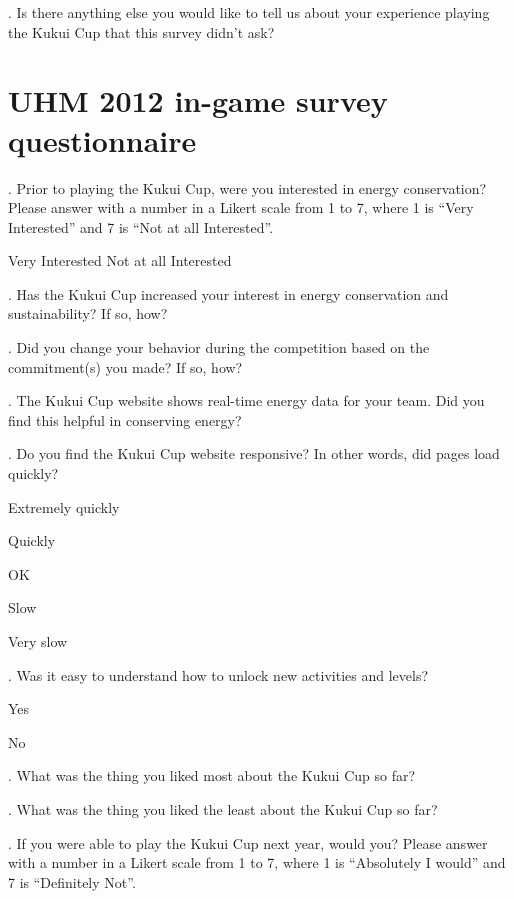 . Is there anything else you would like to tell us about your experience playing the Kukui Cup that this survey didn't ask?

\section {UHM 2012 in-game survey questionnaire}

. Prior to playing the Kukui Cup, were you interested in energy conservation? Please answer with a number in a Likert scale from 1 to 7, where 1 is ``Very Interested'' and 7 is ``Not at all Interested''.

\indent \indent Very Interested                \indent Not at all Interested

. Has the Kukui Cup increased your interest in energy conservation and sustainability? If so, how?

. Did you change your behavior during the competition based on the commitment(s) you made? If
so, how?

. The Kukui Cup website shows real-time energy data for your team. Did you find this helpful in
conserving energy?

. Do you find the Kukui Cup website responsive? In other words, did pages load quickly?
\begin{radiobutton}
	\item Extremely quickly 
	\item Quickly 
	\item OK 
	\item Slow 
	\item Very slow
\end{radiobutton}

. Was it easy to understand how to unlock new activities and levels?
\begin{radiobutton}
	\item Yes
	\item No 
\end{radiobutton}

. What was the thing you liked most about the Kukui Cup so far?

. What was the thing you liked the least about the Kukui Cup so far?

. If you were able to play the Kukui Cup next year, would you? Please answer with a number in a Likert scale from 1 to 7, where 1 is ``Absolutely I would'' and 7 is ``Definitely Not''.

